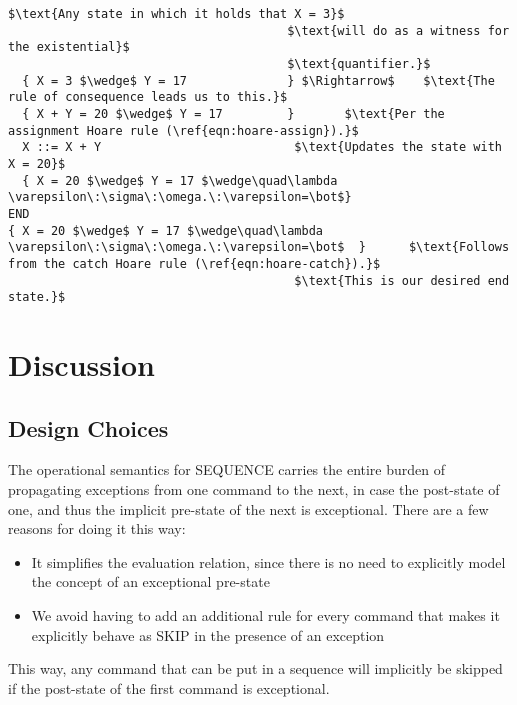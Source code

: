 \begin{lstlisting}[mathescape=true,keepspaces=true,label=lst:hoare_ex_asgn,caption=A small program demonstrating a try-catch statement.]
                                       $\text{Any state in which it holds that X = 3}$
                                       $\text{will do as a witness for the existential}$
                                       $\text{quantifier.}$
  { X = 3 $\wedge$ Y = 17              } $\Rightarrow$    $\text{The rule of consequence leads us to this.}$
  { X + Y = 20 $\wedge$ Y = 17         }       $\text{Per the assignment Hoare rule (\ref{eqn:hoare-assign}).}$
  X ::= X + Y                           $\text{Updates the state with X = 20}$
  { X = 20 $\wedge$ Y = 17 $\wedge\quad\lambda \varepsilon\:\sigma\:\omega.\:\varepsilon=\bot$}
END
{ X = 20 $\wedge$ Y = 17 $\wedge\quad\lambda \varepsilon\:\sigma\:\omega.\:\varepsilon=\bot$  }      $\text{Follows from the catch Hoare rule (\ref{eqn:hoare-catch}).}$
                                        $\text{This is our desired end state.}$
\end{lstlisting}

\section{Discussion}

\subsection{Design Choices}
The operational semantics for SEQUENCE carries the entire burden of propagating exceptions from one command to the next, in case the post-state of one, and thus the implicit pre-state of the next is exceptional. There are a few reasons for doing it this way:

\begin{itemize}
\item It simplifies the evaluation relation, since there is no need to explicitly model the concept of an exceptional pre-state
\item We avoid having to add an additional rule for every command that makes it explicitly behave as SKIP in the presence of an exception
\end{itemize}

This way, any command that can be put in a sequence will implicitly be skipped if the post-state of the first command is exceptional.
